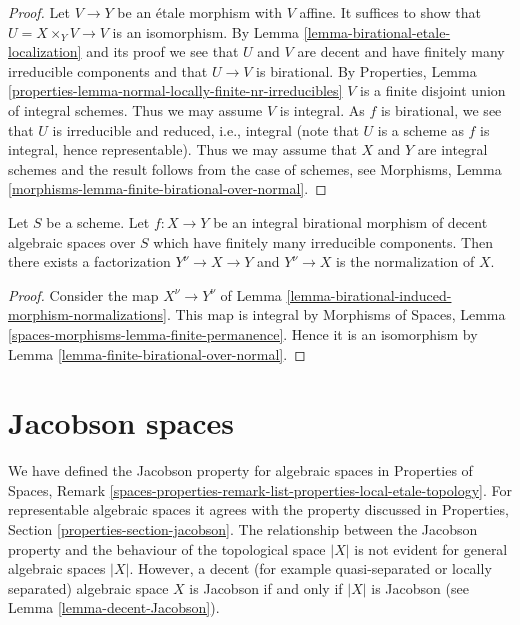 \begin{proof}
Let $V \to Y$ be an \'etale morphism with $V$ affine. It suffices to show that
$U = X \times_Y V \to V$ is an isomorphism. By
Lemma \ref{lemma-birational-etale-localization} and its proof
we see that $U$ and $V$ are decent and have finitely many
irreducible components and that $U \to V$ is birational.
By Properties, Lemma
\ref{properties-lemma-normal-locally-finite-nr-irreducibles}
$V$ is a finite disjoint union of integral schemes.
Thus we may assume $V$ is integral. As $f$ is birational, we
see that $U$ is irreducible and reduced, i.e., integral
(note that $U$ is a scheme as $f$ is integral, hence representable).
Thus we may assume that $X$ and $Y$ are integral schemes
and the result follows from the case of schemes, see
Morphisms, Lemma \ref{morphisms-lemma-finite-birational-over-normal}.
\end{proof}

\begin{lemma}
\label{lemma-normalization-normal}
Let $S$ be a scheme. Let $f : X \to Y$ be an integral birational morphism of
decent algebraic spaces over $S$ which have finitely many irreducible
components. Then there exists a factorization $Y^\nu \to X \to Y$ and
$Y^\nu \to X$ is the normalization of $X$.
\end{lemma}

\begin{proof}
Consider the map $X^\nu \to Y^\nu$ of
Lemma \ref{lemma-birational-induced-morphism-normalizations}.
This map is integral by
Morphisms of Spaces, Lemma \ref{spaces-morphisms-lemma-finite-permanence}.
Hence it is an isomorphism by
Lemma \ref{lemma-finite-birational-over-normal}.
\end{proof}




\section{Jacobson spaces}
\label{section-jacobson}

\noindent
We have defined the Jacobson property for algebraic spaces in
Properties of Spaces, Remark
\ref{spaces-properties-remark-list-properties-local-etale-topology}.
For representable algebraic spaces it agrees with the property discussed in
Properties, Section \ref{properties-section-jacobson}.
The relationship between the Jacobson property and the behaviour of
the topological space $|X|$ is not evident for general algebraic spaces $|X|$.
However, a decent (for example quasi-separated or locally separated)
algebraic space $X$ is Jacobson if and only if $|X|$ is Jacobson
(see Lemma \ref{lemma-decent-Jacobson}).

